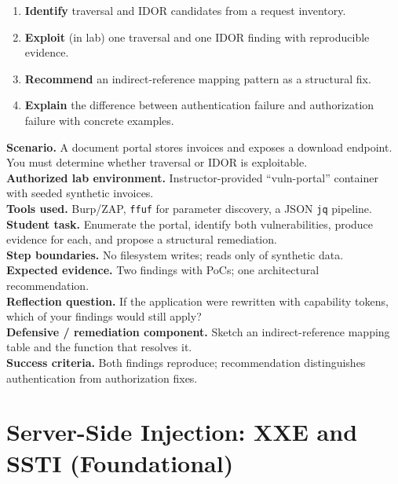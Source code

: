 \documentclass[11pt,letterpaper,oneside]{report}
\newcommand{\tool}[1]{\texttt{\small #1}}
\begin{document}
\begin{outcomes}
\begin{enumerate}
  \item \textbf{Identify} traversal and IDOR candidates from a request inventory.
  \item \textbf{Exploit} (in lab) one traversal and one IDOR finding with reproducible evidence.
  \item \textbf{Recommend} an indirect-reference mapping pattern as a structural fix.
  \item \textbf{Explain} the difference between authentication failure and authorization failure with concrete examples.
\end{enumerate}
\end{outcomes}

\begin{labbox}
\textbf{Scenario.} A document portal stores invoices and exposes a download endpoint. You must determine whether traversal or IDOR is exploitable.\\[3pt]
\textbf{Authorized lab environment.} Instructor-provided ``vuln-portal'' container with seeded synthetic invoices.\\[3pt]
\textbf{Tools used.} Burp/ZAP, \tool{ffuf} for parameter discovery, a JSON \tool{jq} pipeline.\\[3pt]
\textbf{Student task.} Enumerate the portal, identify both vulnerabilities, produce evidence for each, and propose a structural remediation.\\[3pt]
\textbf{Step boundaries.} No filesystem writes; reads only of synthetic data.\\[3pt]
\textbf{Expected evidence.} Two findings with PoCs; one architectural recommendation.\\[3pt]
\textbf{Reflection question.} If the application were rewritten with capability tokens, which of your findings would still apply?\\[3pt]
\textbf{Defensive / remediation component.} Sketch an indirect-reference mapping table and the function that resolves it.\\[3pt]
\textbf{Success criteria.} Both findings reproduce; recommendation distinguishes authentication from authorization fixes.
\end{labbox}

\chapter{Server-Side Injection: XXE and SSTI (Foundational)}
\end{document}
